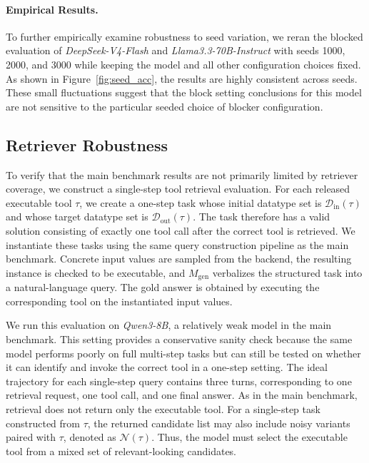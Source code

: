 
\paragraph{Empirical Results.} To further empirically examine robustness to seed variation, we reran the blocked evaluation of \textit{DeepSeek-V4-Flash} and \textit{Llama3.3-70B-Instruct} with seeds 1000, 2000, and 3000 while keeping the model and all other configuration choices fixed. 
As shown in Figure~\ref{fig:seed_acc}, the results are highly consistent across seeds. 
These small fluctuations suggest that the block setting conclusions for this model are not sensitive to the particular seeded choice of blocker configuration.

\subsection{Retriever Robustness}
\label{app:retriever-robustness}


To verify that the main benchmark results are not primarily limited by retriever coverage, we construct a single-step tool retrieval evaluation. 
For each released executable tool $\tau$, we create a one-step task whose initial datatype set is $\mathcal{D}_{\mathrm{in}}(\tau)$ and whose target datatype set is $\mathcal{D}_{\mathrm{out}}(\tau)$.
The task therefore has a valid solution consisting of exactly one tool call after the correct tool is retrieved. 
We instantiate these tasks using the same query construction pipeline as the main benchmark. 
Concrete input values are sampled from the backend, the resulting instance is checked to be executable, and $M_{\mathrm{gen}}$ verbalizes the structured task into a natural-language query. 
The gold answer is obtained by executing the corresponding tool on the instantiated input values.

We run this evaluation on \textit{Qwen3-8B}, a relatively weak model in the main benchmark. 
This setting provides a conservative sanity check because the same model performs poorly on full multi-step tasks but can still be tested on whether it can identify and invoke the correct tool in a one-step setting. 
The ideal trajectory for each single-step query contains three turns, corresponding to one retrieval request, one tool call, and one final answer.
As in the main benchmark, retrieval does not return only the executable tool.
For a single-step task constructed from $\tau$, the returned candidate list may also include noisy variants paired with $\tau$, denoted as $\mathcal{N}(\tau)$.
Thus, the model must select the executable tool from a mixed set of relevant-looking candidates.

